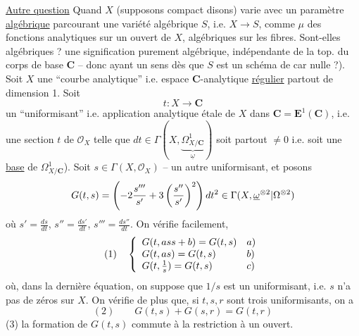 \uline{Autre question} Quand $X$ (supposons compact disons) varie avec un paramètre \uline{algébrique} parcourant une variété algébrique $S$, i.e. \unsure{\ldots} $X\longrightarrow S$,  comme $\mu$ des fonctions analytiques sur un ouvert de $X$, algébriques sur les fibres. Sont-elles algébriques ?  une signification purement algébrique, indépendante de la top. du corps de base $\mathbf C$ -- donc ayant un sens dès que $S$ est un schéma de car nulle ?).
Soit $X$ une ``courbe analytique'' i.e. espace $\mathbf C$-analytique \uline{régulier} partout de dimension 1. Soit
\[
t:X\longrightarrow\mathbf C
\]
un ``uniformisant'' i.e.  application analytique étale de $X$ dans $\mathbf C=\mathbf E^1(\mathbf C)$, i.e. une section $t$ de $\mathcal O_X$ telle que $dt\in\Gamma(X,\underbrace{\Omega^1_{X/\mathbf C}}_{\underline\omega})$ soit partout $\ne0$ i.e. soit une \uline{base} de $\Omega^1_{X/\mathbf C}$). Soit $s\in\Gamma(X,\mathcal O_X)$ --  un autre uniformisant, et posons
\[
G(t,s)=\left(-2\frac{s'''}{s'}+3\left(\frac{s''}{s'}\right)^2\right)dt^2\in\Gamma(X,{\underline\omega^{\otimes2}|\Omega^{\otimes2}})
\]
où $s'=\frac{ds}{dt}$, $s''=\frac{ds'}{dt}$, $s'''=\frac{ds''}{dt}$. On  vérifie facilement,  
\[
(1)\quad\left\{\begin{array}{ll}
G(t,{{as}}s+b)=G(t,s)&a)\\
G(t,as)=G(t,s)&b)\\
G(t,\frac1s)=G(t,s)&c)
\end{array}\right.
\]
où, dans la dernière équation, on suppose que $1/s$ est un uniformisant, i.e. $s$ n'a pas de zéros sur $X$. On vérifie de plus que, si $t,s,r$ sont trois uniformisants, on a
\[
(2)\qquad G(t,s)+G(s,r)=G(t,r)
\]
 (3) la formation de $G(t,s)$ commute à la restriction à un ouvert. 

